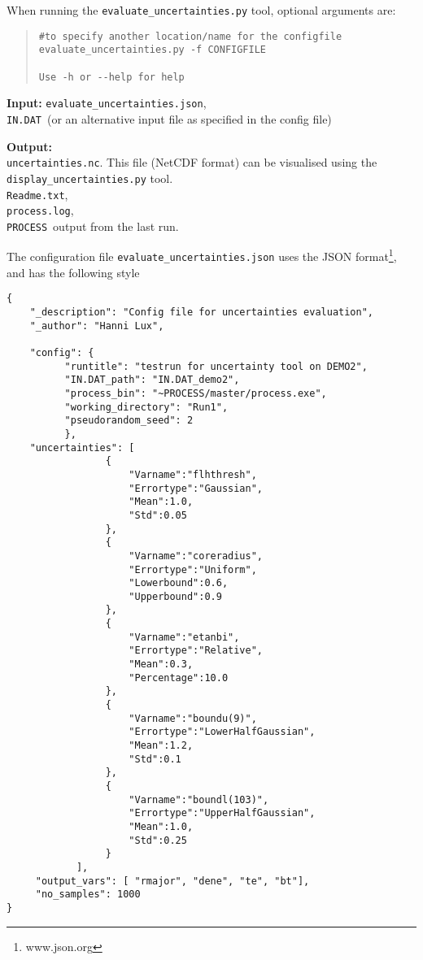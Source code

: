 \documentclass[11pt,a4paper]{article}
\newcommand{\indat}{\mbox{\texttt{IN.DAT}}}
\newcommand{\process}{\mbox{\texttt{PROCESS}}}
\begin{document}
When running the \texttt{evaluate\_uncertainties.py} tool, optional arguments are:
\begin{quote}
\begin{verbatim}
#to specify another location/name for the configfile
evaluate_uncertainties.py -f CONFIGFILE

Use -h or --help for help
\end{verbatim}
\end{quote}



\begin{description}
\item{\textbf{Input:}} \texttt{evaluate\_uncertainties.json},\\
\indat\ (or an alternative input file as specified in the config file)

\item{\textbf{Output:}} \\
\texttt{uncertainties.nc}. This file (NetCDF format) can be visualised using the \texttt{display\_uncertainties.py} tool. \\
\texttt{Readme.txt},\\
\texttt{process.log}, \\
\process\ output from the last run.

\end{description}
The configuration file \texttt{evaluate\_uncertainties.json} uses the JSON
format\footnote{www.json.org}, and has the following style
\begin{framed}
\begin{verbatim}
{
	"_description": "Config file for uncertainties evaluation",
	"_author": "Hanni Lux",

	"config": {
		  "runtitle": "testrun for uncertainty tool on DEMO2",
		  "IN.DAT_path": "IN.DAT_demo2",
		  "process_bin": "~PROCESS/master/process.exe",
		  "working_directory": "Run1",
		  "pseudorandom_seed": 2
		  },
	"uncertainties": [
          	     {
               	     "Varname":"flhthresh",
               	     "Errortype":"Gaussian",
               	     "Mean":1.0,
               	     "Std":0.05
          	     },
          	     {
               	     "Varname":"coreradius",
               	     "Errortype":"Uniform",
               	     "Lowerbound":0.6,
               	     "Upperbound":0.9
          	     },
          	     {
               	     "Varname":"etanbi",
               	     "Errortype":"Relative",
               	     "Mean":0.3,
               	     "Percentage":10.0
          	     },
          	     {
               	     "Varname":"boundu(9)",
               	     "Errortype":"LowerHalfGaussian",
               	     "Mean":1.2,
               	     "Std":0.1
          	     },
          	     {
               	     "Varname":"boundl(103)",
               	     "Errortype":"UpperHalfGaussian",
               	     "Mean":1.0,
               	     "Std":0.25
          	     }
	     	],
     "output_vars": [ "rmajor", "dene", "te", "bt"],
     "no_samples": 1000
}
\end{verbatim}
\end{framed}
\end{document}
